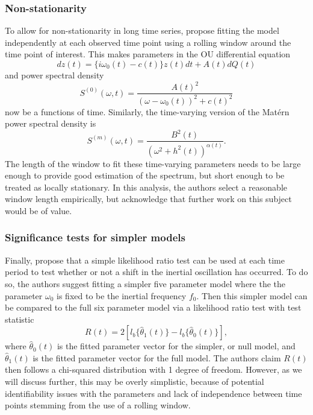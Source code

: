 \documentclass{stat572Style}
\begin{document}
\subsubsection{Non-stationarity}
To allow for non-stationarity in long time series, \citet{Sykulski2016} propose fitting the model independently at each observed time point using a rolling window around the time point of interest. 
This makes parameters in the OU differential equation
\begin{equation}
dz(t) = \{i \omega_{0}(t) - c(t) \} z(t) dt + A(t) dQ(t)
\end{equation}
and power spectral density
\begin{equation}
S^{(0)}(\omega, t) = \frac{A(t)^{2}}{(\omega - \omega_{0}(t))^{2} + c(t)^{2}}
\end{equation}
 now be a functions of time. 
Similarly, the time-varying version of the Mat\'{e}rn power spectral density is 
\begin{equation}
S^{(m)}(\omega, t) = \frac{B^{2}(t)}{(\omega^{2} + h^{2}(t))^{\alpha(t)}}.
\end{equation}
The length of the window to fit these time-varying parameters needs to be large enough to provide good estimation of the spectrum, but short enough to be treated as locally stationary. 
 In this analysis, the authors select a reasonable window length empirically, but acknowledge that further work on this subject would be of value.  

\subsubsection{Significance tests for simpler models}
\label{sec: sig}
Finally, \citet{Sykulski2016} propose that a simple likelihood ratio test can be used at each time period to test whether or not a shift in the inertial oscillation has occurred. 
To do so, the authors suggest fitting a simpler five parameter model where the the parameter $\omega_{0}$ is fixed to be the inertial frequency $f_{0}$. 
Then this simpler model can be compared to the full six parameter model via a likelihood ratio test with test statistic
\begin{equation}
\label{eq: LRT}
R(t) = 2[l_{b} \{\hat{\theta}_{1}(t) \} - l_{b}\{\hat{\theta}_{0}(t) \} ],
\end{equation}
where $\hat{\theta}_{0}(t)$ is the fitted parameter vector for the simpler, or null model, and $\hat{\theta}_{1}(t)$ is the fitted parameter vector for the full model.
 The authors claim $R(t)$ then follows a chi-squared distribution with 1 degree of freedom. 
 However, as we will discuss further, this may be overly simplistic, because of potential identifiability issues with the parameters and lack of independence between time points stemming from the use of a rolling window. 
 
\end{document}
